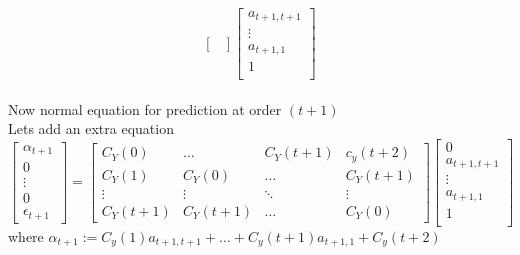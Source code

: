 \documentclass[11pt]{article}
\begin{document}
{\begin{equation}
\begin{bmatrix}
\end{bmatrix}
\begin{bmatrix}
a_{t+1,t+1}\\
\vdots\\
a_{t+1,1}\\
1\\
\end{bmatrix}
\end{equation}\\
Now normal equation for prediction at order $(t+1)$\\

Lets add an extra equation
\begin{equation}
\begin{bmatrix}
\alpha_{t+1}\\
0\\
\vdots\\
0 \\
\epsilon_{t+1}
\end{bmatrix} = 
\begin{bmatrix}
C_Y(0) &\ldots &C_Y(t+1) &c_y(t+2)\\
C_Y(1) &C_Y(0) &\ldots &C_Y(t+1)\\
\vdots &\vdots &\ddots &\vdots\\
C_Y(t+1) &C_Y(t+1) &\ldots &C_Y(0)


\end{bmatrix}
\begin{bmatrix}
0\\
a_{t+1,t+1}\\
\vdots\\
a_{t+1,1}\\
1\\
\end{bmatrix}
\end{equation}
where $\alpha_{t+1} := C_y(1)a_{t+1,t+1} + \ldots + C_y(t+1)a_{t+1,1} + C_y(t+2)$\\


}
\end{document}
